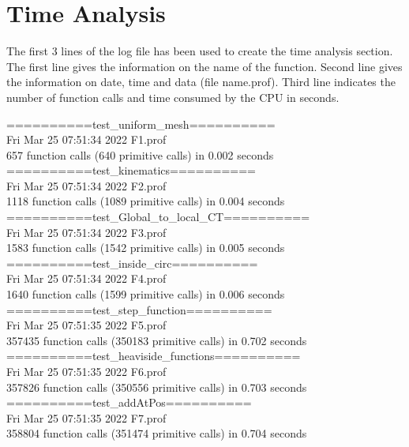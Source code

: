 \documentclass[fleqn, 12.5pt,a4paper]{report}
\newcommand\tab[1][1cm]{\hspace*{#1}}
\begin{document}
\newpage
\section{\Large{Time Analysis}}
The first 3 lines of the log file has been used to create the time analysis section.
The first line gives the information on the name of the function. Second line gives the information on date, time and data (file name.prof). Third line indicates the number of function calls and time consumed by the CPU in seconds.

==========test{\_}uniform{\_}mesh==========\\
Fri Mar 25 07:51:34 2022 \tab[1cm] F1.prof \\
657 function calls (640 primitive calls) in 0.002 seconds\\

==========test{\_}kinematics==========\\
Fri Mar 25 07:51:34 2022 \tab[1cm]    F2.prof\\
1118 function calls (1089 primitive calls) in 0.004 seconds\\

==========test{\_}Global{\_}to{\_}local{\_}CT==========\\
Fri Mar 25 07:51:34 2022 \tab[1cm] F3.prof\\
1583 function calls (1542 primitive calls) in 0.005 seconds\\

==========test{\_}inside{\_}circ==========\\
Fri Mar 25 07:51:34 2022 \tab[1cm]   F4.prof\\
1640 function calls (1599 primitive calls) in 0.006 seconds\\

==========test{\_}step{\_}function==========\\
Fri Mar 25 07:51:35 2022 \tab[1cm]   F5.prof\\
357435 function calls (350183 primitive calls) in 0.702 seconds\\

==========test{\_}heaviside{\_}functions==========\\
Fri Mar 25 07:51:35 2022 \tab[1cm]  F6.prof\\
357826 function calls (350556 primitive calls) in 0.703 seconds\\
 
==========test{\_}addAtPos==========\\
Fri Mar 25 07:51:35 2022 \tab[1cm]   F7.prof\\
358804 function calls (351474 primitive calls) in 0.704 seconds\\
\end{document}
